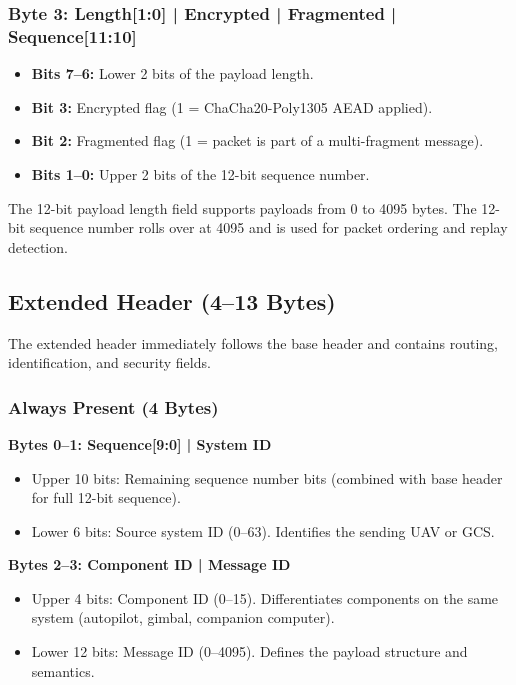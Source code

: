 \documentclass[11pt,a4paper]{article}
\begin{document}
\subsubsection{Byte 3: Length[1:0] | Encrypted | Fragmented | Sequence[11:10]}
\begin{itemize}[noitemsep]
    \item \textbf{Bits 7--6:} Lower 2 bits of the payload length.
    \item \textbf{Bit 3:} Encrypted flag (1 = ChaCha20-Poly1305 AEAD applied).
    \item \textbf{Bit 2:} Fragmented flag (1 = packet is part of a multi-fragment message).
    \item \textbf{Bits 1--0:} Upper 2 bits of the 12-bit sequence number.
\end{itemize}

\begin{notebox}
The 12-bit payload length field supports payloads from 0 to 4095 bytes. The 12-bit sequence number rolls over at 4095 and is used for packet ordering and replay detection.
\end{notebox}

\subsection{Extended Header (4--13 Bytes)}

The extended header immediately follows the base header and contains routing, identification, and security fields.

\subsubsection{Always Present (4 Bytes)}

\textbf{Bytes 0--1: Sequence[9:0] | System ID}
\begin{itemize}[noitemsep]
    \item Upper 10 bits: Remaining sequence number bits (combined with base header for full 12-bit sequence).
    \item Lower 6 bits: Source system ID (0--63). Identifies the sending UAV or GCS.
\end{itemize}

\textbf{Bytes 2--3: Component ID | Message ID}
\begin{itemize}[noitemsep]
    \item Upper 4 bits: Component ID (0--15). Differentiates components on the same system (autopilot, gimbal, companion computer).
    \item Lower 12 bits: Message ID (0--4095). Defines the payload structure and semantics.
\end{itemize}
\end{document}
